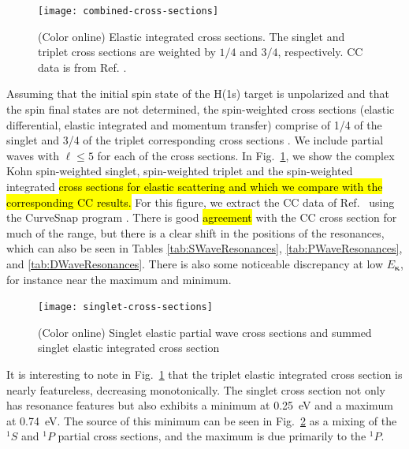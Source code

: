 \documentclass[preprint,showpacs,showkeys,preprintnumbers,amsmath,amssymb,longbibliography,pra,aps]{revtex4-1}
\begin{document}
{\begin{figure}[H]
	\centering
	\texttt{[image: combined-cross-sections]}
	\caption{(Color online) Elastic integrated cross sections. The singlet and
triplet cross sections are weighted by $1/4$ and $3/4$,
respectively. CC data is from Ref. \cite{Walters2004}.}
	\label{fig:combined-cross-sections}
\end{figure}

Assuming that the initial spin state of the H(1s) target is unpolarized and 
that the spin final states are not determined, the spin-weighted cross 
sections (elastic differential, elastic integrated and momentum transfer) 
comprise of 1/4 of the singlet and 3/4 of the triplet corresponding cross 
sections \cite{Blackwood2002,Joachain1979,Ray1996}.
We include partial waves with $\ell \leq 5$ for each of the cross sections. 
In Fig.~\ref{fig:combined-cross-sections}, we show the complex Kohn
spin-weighted singlet, spin-weighted triplet and the spin-weighted integrated 
\hl{cross sections for elastic scattering and which we compare with the
corresponding CC results.}
For this figure, we extract the CC data of
Ref.~\cite{Walters2004} using the CurveSnap program \cite{CurveSnap}.
There is good \hl{agreement} with the 
CC cross section for much of the range, but there is a 
clear shift in the positions of the resonances, which can also be seen in 
Tables \ref{tab:SWaveResonances}, \ref{tab:PWaveResonances}, and
\ref{tab:DWaveResonances}. There is also some noticeable discrepancy at low
$E_{\bm \kappa}$, for instance near the maximum and minimum.

\begin{figure}[H]
	\centering
	\texttt{[image: singlet-cross-sections]}
	\caption{(Color online) Singlet elastic partial wave cross
sections and summed singlet elastic integrated cross section}
	\label{fig:singlet-cross-sections}
\end{figure}

It is interesting to note in Fig.~\ref{fig:combined-cross-sections} that the
triplet elastic integrated cross section is nearly featureless, decreasing
monotonically. The singlet cross section not only has resonance
features but also exhibits a minimum at 0.25~eV and a maximum at 0.74~eV.
The source of this minimum can be seen in
Fig.~\ref{fig:singlet-cross-sections} as a mixing of the $^1S$ and $^1P$
partial cross sections, and the maximum is due primarily to the $^1P$.

}
\end{document}
